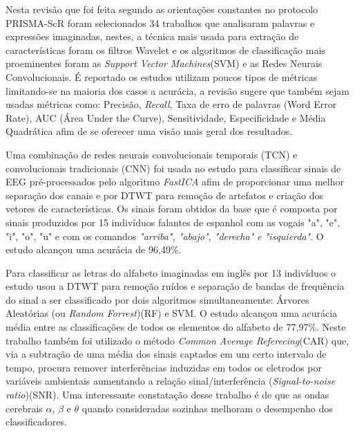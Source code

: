 			\par Nesta revisão \cite{ShahUzair2022TRoA} que foi feita segundo as orientações constantes no protocolo PRISMA-ScR foram selecionados 34 trabalhos que analisaram palavras e expressões imaginadas, nestes, a técnica mais usada para extração de características foram os filtros Wavelet e os algoritmos de classificação mais proeminentes foram as \textit{Support Vector Machines}(SVM) e as Redes Neurais Convolucionais. É reportado os estudos utilizam poucos tipos de métricas limitando-se na maioria dos casos a acurácia, a revisão sugere que também sejam usadas métricas como: Precisão, \textit{Recall}, Taxa de erro de palavras (Word Error Rate), AUC (Área Under the Curve), Sensitividade, Especificidade e Média Quadrática afim de se oferecer uma visão mais geral dos resultados. 
			
			\par Uma combinação de redes neurais convolucionais temporais (TCN) e convolucionais tradicionais (CNN) foi usada no estudo \cite{MahapatraNrushinghCharan2022MCoI} para classificar sinais de EEG pré-processados pelo algoritmo \textit{FastICA} afim de proporcionar uma melhor separação dos canais e por DTWT para remoção de artefatos e criação dos vetores de características. Os sinais foram obtidos da base \cite{10.1117/12.2255697} que é composta por sinais produzidos por 15 indivíduos falantes de espanhol com as vogais "a", "e", "i", "o", "u" e com os comandos \textit{"arriba", "abajo", "derecha" e "isquierda"}. O estudo alcançou uma acurácia de 96,49\%.

			\par Para classificar as letras do alfabeto imaginadas em inglês por 13 indivíduos o estudo \cite{AgarwalPrabhakar2022Ebia} usou a DTWT para remoção ruídos e separação de bandas de frequência do sinal a ser classificado por dois algoritmos simultaneamente: Árvores Aleatórias (ou \textit{Random Forrest})(RF) e SVM. O estudo alcançou uma acurácia média entre as classificações de todos os elementos do alfabeto de 77,97\%. Neste trabalho também foi utilizado o método \textit{Common Average Referecing}(CAR) que, via a subtração de uma média dos sinais captados em um certo intervalo de tempo, procura remover interferências induzidas em todos os eletrodos por variáveis ambientais aumentando a relação sinal/interferência (\textit{Signal-to-noise ratio})(SNR). Uma interessante constatação desse trabalho é de que as ondas cerebrais $\alpha$, $\beta$ e $\theta$ quando consideradas sozinhas melhoram o desempenho dos classificadores.
			
